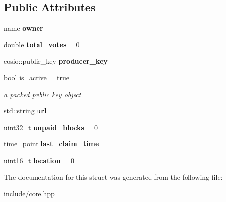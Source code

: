 \subsection*{Public Attributes}
\begin{DoxyCompactItemize}
\item 
\mbox{\label{structproducer__info_afcb44cafef73930c9c8fd31e5fea8333}} 
name {\bfseries owner}
\item 
\mbox{\label{structproducer__info_a0635bce8d0653bbecdfe113a4b659a56}} 
double {\bfseries total\+\_\+votes} = 0
\item 
\mbox{\label{structproducer__info_ae3341e1516eef67ab1a3524bdd1dc03b}} 
eosio\+::public\+\_\+key {\bfseries producer\+\_\+key}
\item 
\mbox{\label{structproducer__info_a1064dde6b317361ddf7c61b65f7687e7}} 
bool \mbox{\hyperlink{structproducer__info_a1064dde6b317361ddf7c61b65f7687e7}{is\+\_\+active}} = true
\begin{DoxyCompactList}\small\item\em a packed public key object \end{DoxyCompactList}\item 
\mbox{\label{structproducer__info_a1f796468dfe9604ed313eda920a28c00}} 
std\+::string {\bfseries url}
\item 
\mbox{\label{structproducer__info_a61a82e8dedfd7dc33d7e8395cc75a765}} 
uint32\+\_\+t {\bfseries unpaid\+\_\+blocks} = 0
\item 
\mbox{\label{structproducer__info_ac65e5d398ed775a2655da08ad130db43}} 
time\+\_\+point {\bfseries last\+\_\+claim\+\_\+time}
\item 
\mbox{\label{structproducer__info_a459371049ff8d064ec0d1055e7620a22}} 
uint16\+\_\+t {\bfseries location} = 0
\end{DoxyCompactItemize}


The documentation for this struct was generated from the following file\+:\begin{DoxyCompactItemize}
\item 
include/core.\+hpp\end{DoxyCompactItemize}
